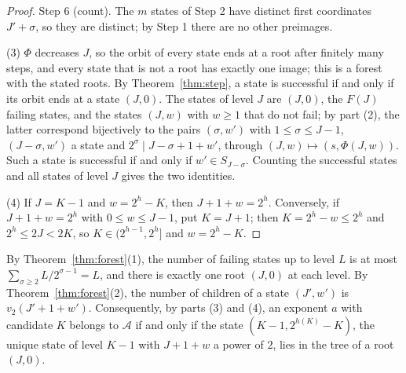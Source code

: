 \documentclass[11pt]{amsart}
\theoremstyle{definition}
\begin{document}
\begin{proof}
Step 6 (count). The $m$ states of Step 2 have distinct first coordinates $J'+\sigma$, so they are distinct; by Step 1 there are no other preimages.

(3) $\Phi$ decreases $J$, so the orbit of every state ends at a root after finitely many steps, and every state that is not a root has exactly one image; this is a forest with the stated roots. By Theorem~\ref{thm:step}, a state is successful if and only if its orbit ends at a state $(J,0)$. The states of level $J$ are $(J,0)$, the $F(J)$ failing states, and the states $(J,w)$ with $w\ge1$ that do not fail; by part (2), the latter correspond bijectively to the pairs $(\sigma,w')$ with $1\le\sigma\le J-1$, $(J-\sigma,w')$ a state and $2^\sigma\mid J-\sigma+1+w'$, through $(J,w)\mapsto(s,\Phi(J,w))$. Such a state is successful if and only if $w'\in S_{J-\sigma}$. Counting the successful states and all states of level $J$ gives the two identities.

(4) If $J=K-1$ and $w=2^h-K$, then $J+1+w=2^h$. Conversely, if $J+1+w=2^h$ with $0\le w\le J-1$, put $K=J+1$; then $K=2^h-w\le2^h$ and $2^h\le2J<2K$, so $K\in(2^{h-1},2^h]$ and $w=2^h-K$.
\end{proof}

By Theorem~\ref{thm:forest}(1), the number of failing states up to level $L$ is at most $\sum_{\sigma\ge2}L/2^{\sigma-1}=L$, and there is exactly one root $(J,0)$ at each level. By Theorem~\ref{thm:forest}(2), the number of children of a state $(J',w')$ is $v_2(J'+1+w')$. Consequently, by parts (3) and (4), an exponent $a$ with candidate $K$ belongs to $\mathcal{A}$ if and only if the state $(K-1,2^{h(K)}-K)$, the unique state of level $K-1$ with $J+1+w$ a power of $2$, lies in the tree of a root $(J,0)$.
\end{document}
